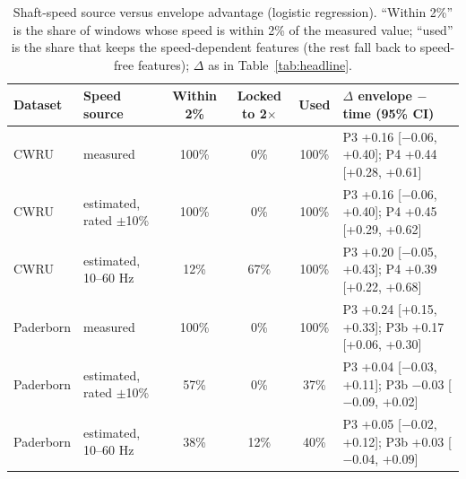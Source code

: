 \begin{table}[t]
\caption{Shaft-speed source versus envelope advantage (logistic regression). ``Within 2\%'' is the share of windows whose speed is within 2\% of the measured value; ``used'' is the share that keeps the speed-dependent features (the rest fall back to speed-free features); $\Delta$ as in Table~\ref{tab:headline}.}
\label{tab:speed}
\centering
\begin{tabular}{llcccl}
\hline
Dataset & Speed source & Within 2\% & Locked to 2$\times$ & Used & $\Delta$ envelope $-$ time (95\% CI) \\
\hline
CWRU & measured & 100\% & 0\% & 100\% & P3 +0.16 [$-$0.06, +0.40]; P4 +0.44 [+0.28, +0.61] \\
CWRU & estimated, rated $\pm$10\% & 100\% & 0\% & 100\% & P3 +0.16 [$-$0.06, +0.40]; P4 +0.45 [+0.29, +0.62] \\
CWRU & estimated, 10--60 Hz & 12\% & 67\% & 100\% & P3 +0.20 [$-$0.05, +0.43]; P4 +0.39 [+0.22, +0.68] \\
Paderborn & measured & 100\% & 0\% & 100\% & P3 +0.24 [+0.15, +0.33]; P3b +0.17 [+0.06, +0.30] \\
Paderborn & estimated, rated $\pm$10\% & 57\% & 0\% & 37\% & P3 +0.04 [$-$0.03, +0.11]; P3b $-$0.03 [$-$0.09, +0.02] \\
Paderborn & estimated, 10--60 Hz & 38\% & 12\% & 40\% & P3 +0.05 [$-$0.02, +0.12]; P3b +0.03 [$-$0.04, +0.09] \\
\hline
\end{tabular}
\end{table}
